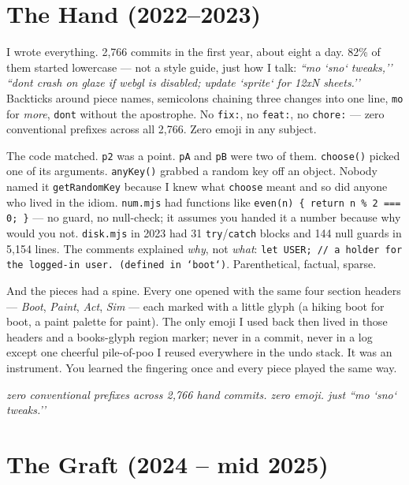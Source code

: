 \documentclass[10pt,letterpaper,twocolumn]{article}
\newcommand{\pull}[1]{%
  \par\vspace{0.4em}
  {\aclight\small\color{acpink}\itshape #1}\par
  \vspace{0.4em}}
\begin{document}

\section{The Hand (2022--2023)}

I wrote everything. 2,766 commits in the first year, about eight a day. 82\% of them started lowercase --- not a style guide, just how I talk: \emph{``mo `sno` tweaks,''} \emph{``dont crash on glaze if webgl is disabled; update `sprite` for 12xN sheets.''} Backticks around piece names, semicolons chaining three changes into one line, \texttt{mo} for \emph{more}, \texttt{dont} without the apostrophe. No \texttt{fix:}, no \texttt{feat:}, no \texttt{chore:} --- zero conventional prefixes across all 2,766. Zero emoji in any subject.

The code matched. \texttt{p2} was a point. \texttt{pA} and \texttt{pB} were two of them. \texttt{choose()} picked one of its arguments. \texttt{anyKey()} grabbed a random key off an object. Nobody named it \texttt{getRandomKey} because I knew what \texttt{choose} meant and so did anyone who lived in the idiom. \texttt{num.mjs} had functions like \texttt{even(n) \{ return n \% 2 === 0; \}} --- no guard, no null-check; it assumes you handed it a number because why would you not. \texttt{disk.mjs} in 2023 had 31 \texttt{try}/\texttt{catch} blocks and 144 null guards in 5,154 lines. The comments explained \emph{why}, not \emph{what}: \texttt{let USER; // a holder for the logged-in user. (defined in `boot`)}. Parenthetical, factual, sparse.

And the pieces had a spine. Every one opened with the same four section headers --- \emph{Boot}, \emph{Paint}, \emph{Act}, \emph{Sim} --- each marked with a little glyph (a hiking boot for boot, a paint palette for paint). The only emoji I used back then lived in those headers and a books-glyph region marker; never in a commit, never in a log except one cheerful pile-of-poo I reused everywhere in the undo stack. It was an instrument. You learned the fingering once and every piece played the same way.

\pull{zero conventional prefixes across 2,766 hand commits. zero emoji. just ``mo `sno` tweaks.''}


\section{The Graft (2024 -- mid 2025)}
\end{document}
